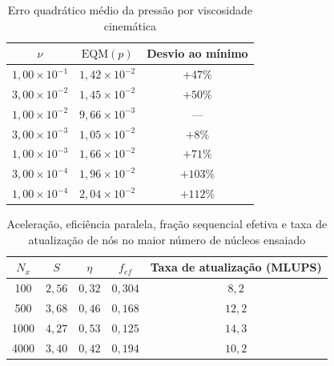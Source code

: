 \begin{table}[H]
    \centering
    \caption{Erro quadrático médio da pressão por viscosidade cinemática}
    \label{tab:erro-viscosidade}
    \begin{tabular}{ccc}
        \toprule
        \(\nu\) & \(\mathrm{EQM}(p)\) & Desvio ao mínimo \\
        \midrule
        \(1{,}00\times10^{-1}\) & \(1{,}42\times10^{-2}\) & \(+47\%\) \\
        \(3{,}00\times10^{-2}\) & \(1{,}45\times10^{-2}\) & \(+50\%\) \\
        \(1{,}00\times10^{-2}\) & \(9{,}66\times10^{-3}\) & --- \\
        \(3{,}00\times10^{-3}\) & \(1{,}05\times10^{-2}\) & \(+8\%\) \\
        \(1{,}00\times10^{-3}\) & \(1{,}66\times10^{-2}\) & \(+71\%\) \\
        \(3{,}00\times10^{-4}\) & \(1{,}96\times10^{-2}\) & \(+103\%\) \\
        \(1{,}00\times10^{-4}\) & \(2{,}04\times10^{-2}\) & \(+112\%\) \\
        \bottomrule
    \end{tabular}
\end{table}

\begin{table}[H]
    \centering
    \caption{Aceleração, eficiência paralela, fração sequencial efetiva e taxa de atualização de nós no maior número de núcleos ensaiado}
    \label{tab:escalabilidade-cpu}
    \begin{tabular}{ccccc}
        \toprule
        \(N_x\) & \(S\) & \(\eta\) & \(f_{ef}\) & Taxa de atualização (MLUPS) \\
        \midrule
        100 & \(2{,}56\) & \(0{,}32\) & \(0{,}304\) & \(8{,}2\) \\
        500 & \(3{,}68\) & \(0{,}46\) & \(0{,}168\) & \(12{,}2\) \\
        1000 & \(4{,}27\) & \(0{,}53\) & \(0{,}125\) & \(14{,}3\) \\
        4000 & \(3{,}40\) & \(0{,}42\) & \(0{,}194\) & \(10{,}2\) \\
        \bottomrule
    \end{tabular}
\end{table}

